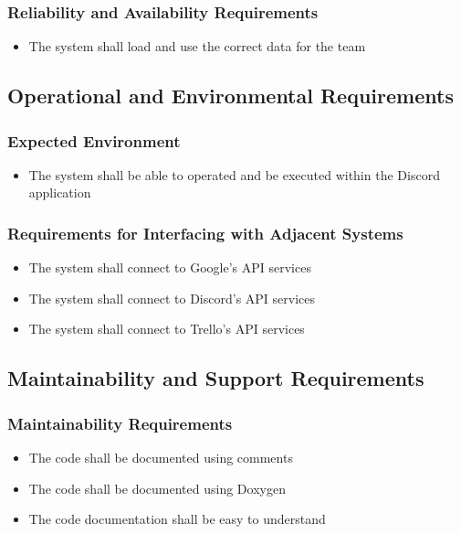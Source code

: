 \documentclass[12pt, titlepage]{article}
\begin{document}
\subsubsection{Reliability and Availability Requirements}
\begin{itemize}
    \item The system shall load and use the correct data for the team
\end{itemize}

\subsection{Operational and Environmental Requirements}
\subsubsection{Expected Environment}
\begin{itemize}
    \item The system shall be able to operated and be executed within the Discord application
\end{itemize}
\subsubsection{Requirements for Interfacing with Adjacent Systems}
\begin{itemize}
    \item The system shall connect to Google's API services
    \item The system shall connect to Discord's API services
    \item The system shall connect to Trello's API services
\end{itemize}

\subsection{Maintainability and Support Requirements}
\subsubsection{Maintainability Requirements}
\begin{itemize}
    \item The code shall be documented using comments
    \item The code shall be documented using Doxygen
    \item The code documentation shall be easy to understand
\end{itemize}
\end{document}
